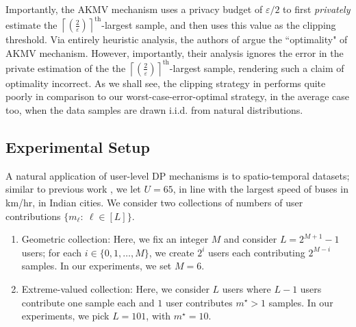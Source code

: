 Importantly, the AKMV mechanism uses a privacy budget of $\varepsilon/2$ to first \emph{privately} estimate the $\left \lceil \left(\frac{2}{\varepsilon}\right)\right \rceil^{\text{th}}$-largest sample, and then uses this value as the clipping threshold. Via entirely heuristic analysis, the authors of \cite{amin} argue the ``optimality" of AKMV mechanism. However, importantly, their analysis ignores the error in the private estimation of the the $\left \lceil \left(\frac{2}{\varepsilon}\right)\right \rceil^{\text{th}}$-largest sample, rendering such a claim of optimality incorrect. As we shall see, the clipping strategy in \cite[Sec. 3]{amin} performs quite poorly in comparison to our worst-case-error-optimal strategy, in the average case too, when the data samples are drawn i.i.d. from natural distributions.

\subsection{Experimental Setup}
\label{sec:exp-setup}
A natural application of user-level DP mechanisms is to spatio-temporal datasets; similar to previous work \cite{dp_spcom,dp_preprint}, we let $U = 65$, in line with the largest speed of buses in km/hr, in Indian cities. We consider two collections of numbers of user contributions $\{m_\ell:\ \ell\in [L]\}$. 
\begin{enumerate}
	\item Geometric collection: Here, we fix an integer $M$ and consider $L = 2^{M+1}-1$ users; for each $i\in \{0,1,\ldots,M\}$, we create $2^i$ users each contributing $2^{M-i}$ samples. 
	In our experiments, we set $M = 6$.
	\item Extreme-valued collection: Here, we consider $L$ users where $L-1$ users contribute one sample each and $1$ user contributes $m^\star>1$ samples. %
	In our experiments, we pick $L = 101$, with $m^\star = 10$.
\end{enumerate}
